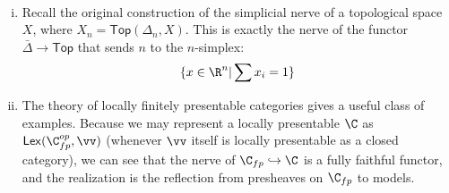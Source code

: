 \begin{example}
    ~\begin{enumerate}[(i)]
        \item Recall the original construction of the simplicial nerve of a topological space $X$, where $X_n = \mathsf{Top}(\Delta_n,X)$.
        This is exactly the nerve of the functor $\bar{\Delta} \to \mathsf{Top}$ that sends $n$ to the $n$-simplex:
        \[
            \{
                x \in \R^n | \sum x_i = 1
            \}
        \]
        \item The theory of locally finitely presentable categories gives a useful class of examples.
        Because we may represent a locally presentable $\C$ as $\mathsf{Lex}(\C_{fp}^{op}, \vv)$ (whenever $\vv$ itself is locally presentable as a closed category), we can see that the nerve of $\C_{fp} \hookrightarrow \C$ is a fully faithful functor, and the realization is the reflection from presheaves on $\C_{fp}$ to models.
    \end{enumerate}
\end{example}

